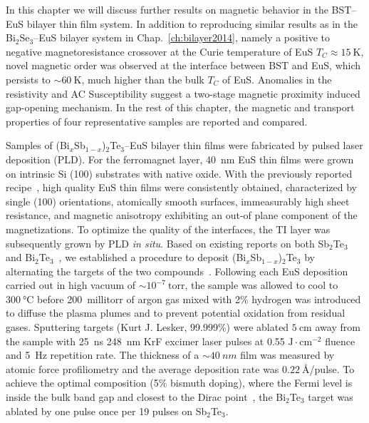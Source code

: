 In this chapter we will discuss further results on magnetic behavior in the BST--EuS bilayer thin film system. In addition to reproducing similar results as in the Bi$_2$Se$_3$--EuS bilayer system in Chap.~\ref{ch:bilayer2014}, namely a positive to negative magnetoresistance crossover at the Curie temperature of EuS $T_C\approx15~\mathrm{K}$, novel magnetic order was observed at the interface between BST and EuS, which persists to $\sim 60~\mathrm{K}$, much higher than the bulk $T_C$ of EuS. Anomalies in the resistivity and AC Susceptibility suggest a two-stage magnetic proximity induced gap-opening mechanism. In the rest of this chapter, the magnetic and transport properties of four representative samples are reported and compared.


Samples of (Bi$_{x}$Sb$_{1-x}$)$_2$Te$_3$--EuS bilayer thin films were fabricated by pulsed laser deposition (PLD). For the ferromagnet layer, 40~nm EuS thin films were grown on intrinsic Si (100) substrates with native oxide. With the previously reported recipe~\cite{EuS_PLD}, high quality EuS thin films were consistently obtained, characterized by single (100) orientations, atomically smooth surfaces, immeasurably high sheet resistance, and magnetic anisotropy exhibiting an out-of plane component of the magnetizations. To optimize the quality of the interfaces, the TI layer was subsequently grown by PLD \textit{in situ}. Based on existing reports on both Sb$_2$Te$_3$ and Bi$_2$Te$_3$~\cite{telluride_PLD1, telluride_PLD2}, we established a procedure to deposit (Bi$_{x}$Sb$_{1-x}$)$_2$Te$_3$ by alternating the targets of the two compounds~\cite{PLD_alt_target2, PLD_alt_target}. Following each EuS deposition carried out in high vacuum of $\sim10^{-7}~\mathrm{torr}$,  the sample was allowed to cool to $\SI{300}{\degreeCelsius}$ before 200~millitorr of argon gas mixed with 2\% hydrogen was introduced to diffuse the plasma plumes and to prevent potential oxidation from residual gases. Sputtering targets (Kurt J. Lesker, 99.999\%) were ablated $\SI{5}{\cm}$ away from the sample with 25~ns 248~nm KrF excimer laser pulses at 0.55 $\mathrm{J\cdot{}cm^{-2}}$ fluence and 5~Hz repetition rate. The thickness of a $\sim\SI{40}{nm}$ film was measured by atomic force profiliometry and the average deposition rate was $\SI{0.22}{\angstrom}$/pulse. To achieve the optimal composition (5$\%$ bismuth doping), where the Fermi level is inside the bulk band gap and closest to the Dirac point~\cite{ZhangJS2011}, the Bi$_2$Te$_3$ target was ablated by one pulse once per 19 pulses on Sb$_2$Te$_3$. 


